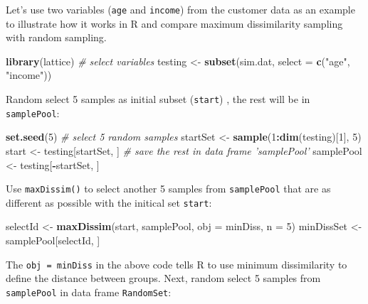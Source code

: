 \documentclass[12pt,]{krantz}
\makeatletter
\newenvironment{Shaded}{\begin{snugshade}}{\end{snugshade}}
\newcommand{\CommentTok}[1]{\textcolor[rgb]{0.37,0.37,0.37}{\textit{#1}}}
\newcommand{\DataTypeTok}[1]{\textcolor[rgb]{0.27,0.27,0.27}{#1}}
\newcommand{\DecValTok}[1]{\textcolor[rgb]{0.06,0.06,0.06}{#1}}
\newcommand{\KeywordTok}[1]{\textcolor[rgb]{0.27,0.27,0.27}{\textbf{#1}}}
\newcommand{\NormalTok}[1]{#1}
\newcommand{\OperatorTok}[1]{\textcolor[rgb]{0.43,0.43,0.43}{\textbf{#1}}}
\newcommand{\StringTok}[1]{\textcolor[rgb]{0.5,0.5,0.5}{#1}}
\newenvironment{kframe}{%
\medskip{}
\setlength{\fboxsep}{.8em}
 \def\at@end@of@kframe{}%
 \ifinner\ifhmode%
  \def\at@end@of@kframe{\end{minipage}}%
  \begin{minipage}{\columnwidth}%
 \fi\fi%
 \def\FrameCommand##1{\hskip\@totalleftmargin \hskip-\fboxsep
 \colorbox{shadecolor}{##1}\hskip-\fboxsep
     \hskip-\linewidth \hskip-\@totalleftmargin \hskip\columnwidth}%
 \MakeFramed {\advance\hsize-\width
   \@totalleftmargin\z@ \linewidth\hsize
   \@setminipage}}%
 {\par\unskip\endMakeFramed%
 \at@end@of@kframe}
\renewenvironment{Shaded}{\begin{kframe}}{\end{kframe}}
\makeatother
\begin{document}
Let's use two variables (\texttt{age} and \texttt{income}) from the customer data as an example to illustrate how it works in R and compare maximum dissimilarity sampling with random sampling.

\begin{Shaded}
\begin{Highlighting}[]
\KeywordTok{library}\NormalTok{(lattice)}
\CommentTok{# select variables}
\NormalTok{testing <-}\StringTok{ }\KeywordTok{subset}\NormalTok{(sim.dat, }\DataTypeTok{select =} \KeywordTok{c}\NormalTok{(}\StringTok{"age"}\NormalTok{, }\StringTok{"income"}\NormalTok{))}
\end{Highlighting}
\end{Shaded}

Random select 5 samples as initial subset (\texttt{start}) , the rest will be in \texttt{samplePool}:

\begin{Shaded}
\begin{Highlighting}[]
\KeywordTok{set.seed}\NormalTok{(}\DecValTok{5}\NormalTok{)}
\CommentTok{# select 5 random samples}
\NormalTok{startSet <-}\StringTok{ }\KeywordTok{sample}\NormalTok{(}\DecValTok{1}\OperatorTok{:}\KeywordTok{dim}\NormalTok{(testing)[}\DecValTok{1}\NormalTok{], }\DecValTok{5}\NormalTok{)}
\NormalTok{start <-}\StringTok{ }\NormalTok{testing[startSet, ]}
\CommentTok{# save the rest in data frame 'samplePool'}
\NormalTok{samplePool <-}\StringTok{ }\NormalTok{testing[}\OperatorTok{-}\NormalTok{startSet, ]}
\end{Highlighting}
\end{Shaded}

Use \texttt{maxDissim()} to select another 5 samples from \texttt{samplePool} that are as different as possible with the initical set \texttt{start}:

\begin{Shaded}
\begin{Highlighting}[]
\NormalTok{selectId <-}\StringTok{ }\KeywordTok{maxDissim}\NormalTok{(start, samplePool, }\DataTypeTok{obj =}\NormalTok{ minDiss, }\DataTypeTok{n =} \DecValTok{5}\NormalTok{)}
\NormalTok{minDissSet <-}\StringTok{ }\NormalTok{samplePool[selectId, ]}
\end{Highlighting}
\end{Shaded}

The \texttt{obj\ =\ minDiss} in the above code tells R to use minimum dissimilarity to define the distance between groups. Next, random select 5 samples from \texttt{samplePool} in data frame \texttt{RandomSet}:
\end{document}
